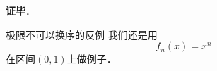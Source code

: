 \textbf{证毕}．



\begin{example}{极限不可以换序的反例}
我们还是用
\begin{equation}
f_n(x)=x^n
\end{equation}
在区间$(0, 1)$上做例子．
\begin{equation}

\end{equation}
\end{example}


















